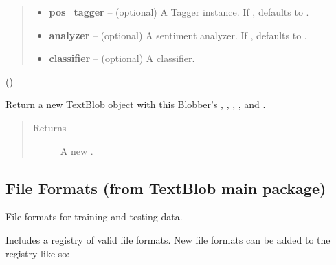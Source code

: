 \documentclass[letterpaper,10pt,english]{sphinxmanual}
\begin{document}
\begin{fulllineitems}
\begin{quote}
\begin{description}
\begin{itemize}
\item {} 
\textbf{pos\_tagger} -- (optional) A Tagger instance. If , defaults to
{\hyperref[api_reference:textblob_de.taggers.PatternTagger]{}}.

\item {} 
\textbf{analyzer} -- (optional) A sentiment analyzer. If , defaults to
{\hyperref[api_reference:textblob_de.sentiments.PatternAnalyzer]{}}.

\item {} 
\textbf{classifier} -- (optional) A classifier.

\end{itemize}

\end{description}\end{quote}

()

\begin{fulllineitems}
\label{api_reference:textblob_de.blob.BlobberDE.__call__}
Return a new TextBlob object with this Blobber's ,
, , , and .
\begin{quote}\begin{description}
\item[{Returns}] \leavevmode
A new .

\end{description}\end{quote}

\end{fulllineitems}


\end{fulllineitems}



\subsection{File Formats (from TextBlob main package)}
\label{api_reference:module-textblob.formats}\label{api_reference:file-formats-from-textblob-main-package}
File formats for training and testing data.

Includes a registry of valid file formats. New file formats can be added to the
registry like so:
\end{document}
